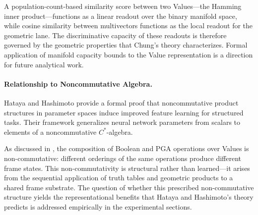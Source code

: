A population-count-based similarity score between two Values---the
Hamming inner product---functions as a linear readout over the binary
manifold space, while cosine similarity between multivectors functions
as the local readout for the geometric lane.  The discriminative
capacity of these readouts is therefore governed by the geometric
properties that Chung's theory characterizes.  Formal application of
manifold capacity bounds to the Value representation is a direction for
future analytical work.

\paragraph{Relationship to Noncommutative Algebra.}
Hataya and Hashimoto \citep{hataya2023noncommutative} provide a formal
proof that noncommutative product structures in parameter spaces induce
improved feature learning for structured tasks.  Their framework
generalizes neural network parameters from scalars to elements of a
noncommutative $C^*$-algebra.

As discussed in , the composition
of Boolean and PGA operations over Values is non-commutative: different
orderings of the same operations produce different frame states.  This
non-commutativity is structural rather than learned---it arises from the
sequential application of truth tables and geometric products to a shared
frame substrate.  The question of whether this prescribed
non-commutative structure yields the representational benefits that
Hataya and Hashimoto's theory predicts is addressed empirically in the
experimental sections.
